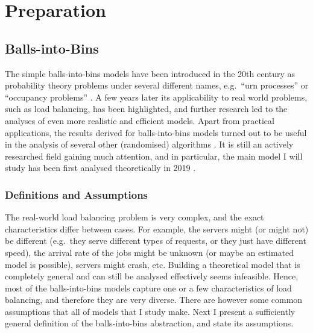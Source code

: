 \chapter{Preparation}\label{preparation}

\ifpdf
    \graphicspath{{Chapter2/Figs/Raster/}{Chapter2/Figs/PDF/}{Chapter2/Figs/}}
\else
    \graphicspath{{Chapter2/Figs/Vector/}{Chapter2/Figs/}}
\fi



\section{Balls-into-Bins}


The simple balls-into-bins models have been introduced in the 20th century as probability theory problems under several different names, e.g.\ ``urn processes'' or ``occupancy problems'' \cite{kolchin1978coined}. A few years later its applicability to real world problems, such as load balancing, has been highlighted, and further research led to the analyses of even more realistic and efficient models. Apart from practical applications, the results derived for balls-into-bins models turned out to be useful in the analysis of several other (randomised) algorithms \cite{edmonds2006cakecutting}. It is still an actively researched field gaining much attention, and in particular, the main model I will study has been first analysed theoretically in 2019 \cite{dwivedi2019firstthinning}.


\subsection{Definitions and Assumptions}



The real-world load balancing problem is very complex, and the exact characteristics differ between cases. For example, the servers might (or might not) be different (e.g.\ they serve different types of requests, or they just have different speed), the arrival rate of the jobs might be unknown (or maybe an estimated model is possible), servers might crash, etc. Building a theoretical model that is completely general and can still be analysed effectively seems infeasible. Hence, most of the balls-into-bins models capture one or a few characteristics of load balancing, and therefore they are very diverse. There are however some common assumptions that all of models that I study make. Next I present a sufficiently general definition of the balls-into-bins abstraction, and state its assumptions. 

